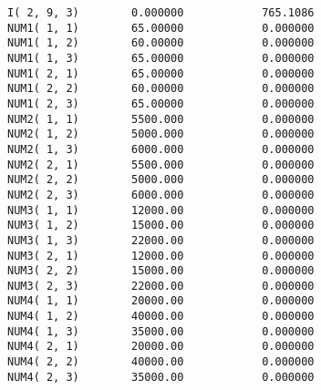 \documentclass[12pt]{article}
\begin{document}
\begin{appendices}
\begin{lstlisting}
I( 2, 9, 3)        0.000000            765.1086
NUM1( 1, 1)        65.00000            0.000000
NUM1( 1, 2)        60.00000            0.000000
NUM1( 1, 3)        65.00000            0.000000
NUM1( 2, 1)        65.00000            0.000000
NUM1( 2, 2)        60.00000            0.000000
NUM1( 2, 3)        65.00000            0.000000
NUM2( 1, 1)        5500.000            0.000000
NUM2( 1, 2)        5000.000            0.000000
NUM2( 1, 3)        6000.000            0.000000
NUM2( 2, 1)        5500.000            0.000000
NUM2( 2, 2)        5000.000            0.000000
NUM2( 2, 3)        6000.000            0.000000
NUM3( 1, 1)        12000.00            0.000000
NUM3( 1, 2)        15000.00            0.000000
NUM3( 1, 3)        22000.00            0.000000
NUM3( 2, 1)        12000.00            0.000000
NUM3( 2, 2)        15000.00            0.000000
NUM3( 2, 3)        22000.00            0.000000
NUM4( 1, 1)        20000.00            0.000000
NUM4( 1, 2)        40000.00            0.000000
NUM4( 1, 3)        35000.00            0.000000
NUM4( 2, 1)        20000.00            0.000000
NUM4( 2, 2)        40000.00            0.000000
NUM4( 2, 3)        35000.00            0.000000
\end{lstlisting}

\end{appendices}
\end{document}
